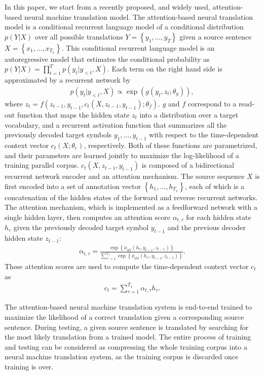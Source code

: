 In this paper, we start from a recently proposed, and widely used, attention-based neural machine translation model\citep{bahdanau2014neural}. The attention-based neural translation model is a conditional recurrent language model of a conditional distribution $p(Y|X)$ over all possible translations $Y=\left\{ y_1, \ldots, y_T \right\}$ given a source sentence $X=\left\{ x_1, \ldots, x_{T_x}\right\}$. This conditional recurrent language model is an autoregressive model that estimates the conditional probability as
$p(Y|X) = \prod_{t=1}^T p(y_t | y_{<t}, X)$. Each term on the right hand side is approximated by a recurrent network by 
\begin{align}
\label{eq.prob}
p(y_t|y_{<t}, X)\propto \exp\left(g\left(y_t, z_t; \theta_g\right)\right),
\end{align}
where 
$z_t = f(z_{t-1}, y_{t-1}, c_t(X, z_{t-1}, y_{t-1}); \theta_f)$. $g$ and $f$ correspond to a read-out function that maps the hidden state $z_t$ into a distribution over a target vocabulary, and a recurrent activation function that summarizes all the previously decoded target symbols $y_1, \ldots, y_{t-1}$ with respect to the time-dependent context vector $c_t(X; \theta_e)$, respectively. Both of these functions are parametrized, and their parameters are learned jointly to maximize the log-likelihood of a training parallel corpus.
$c_t(X, z_{t-1}, y_{t-1})$ is composed of a bidirectional recurrent network encoder and an attention mechanism. The source sequence $X$ is first encoded into a set of annotation vector $\left\{ h_1, \ldots, h_{T_x} \right\}$, each of which is a concatenation of the hidden states of the forward and reverse recurrent networks. The attention mechanism, which is implemented as a feedforward network with a single hidden layer, then computes an attention score $\alpha_{t, \tau}$ for each hidden state $h_{\tau}$ given the previously decoded target symbol $y_{t-1}$ and the previous decoder hidden state $z_{t-1}$:
\begin{align*}
\alpha_{t, \tau} = \frac{\exp\left\{ \phi_{\text{att}} (h_{\tau}, y_{t-1}, z_{t-1}) \right\}}
{\sum_{\tau'=1}^{T_x} \exp\left\{ \phi_{\text{att}} (h_{\tau'}, y_{t-1}, z_{t-1}) \right\}}.
\end{align*}
These attention scores are used to compute the time-dependent context vector $c_t$ as 
\begin{align}
\label{eq.context}
c_t = \sum_{\tau=1}^{T_x} \alpha_{t, \tau} h_{\tau}.
\end{align}

The attention-based neural machine translation system is end-to-end trained to maximize the likelihood of a correct translation given a corresponding source sentence. During testing, a given source sentence is translated by searching for the most likely translation from a trained model. The entire process of training and testing can be considered as compressing the whole training corpus into a neural machine translation system, as the training corpus is discarded once training is over. 

